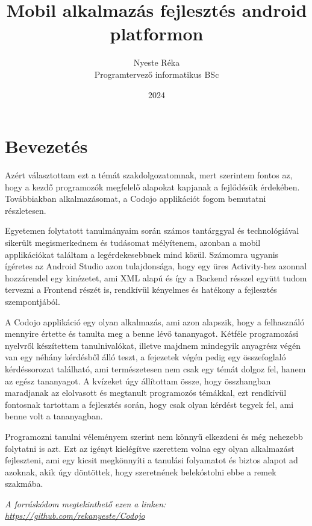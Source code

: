 \documentclass{thesis-ekf}
\begin{document}
	\title{Mobil alkalmazás fejlesztés android platformon}
	\author{Nyeste Réka\\Programtervező informatikus BSc}
	\date{2024}
	\maketitle
	\tableofcontents
	\chapter*{Bevezetés}
	Azért választottam ezt a témát szakdolgozatomnak, mert szerintem fontos az, hogy a kezdő programozók megfelelő alapokat kapjanak a fejlődésük érdekében. Továbbiakban alkalmazásomat, a Codojo applikációt fogom bemutatni részletesen.
	
	Egyetemen folytatott tanulmányaim során számos tantárggyal és technológiával sikerült megismerkednem és tudásomat mélyítenem, azonban a mobil applikációkat találtam a legérdekesebbnek mind közül. Számomra ugyanis ígéretes az Android Studio azon tulajdonsága, hogy egy üres Activity-hez azonnal hozzárendel egy kinézetet, ami XML alapú és így a Backend résszel együtt tudom tervezni a Frontend részét is, rendkívül kényelmes és hatékony a fejlesztés szempontjából.
	
	A Codojo applikáció egy olyan alkalmazás, ami azon alapszik, hogy a felhasználó mennyire értette és tanulta meg a benne lévő tananyagot. Kétféle programozási nyelvről készítettem tanulnivalókat, illetve majdnem mindegyik anyagrész végén van egy néhány kérdésből álló teszt, a fejezetek végén pedig egy összefoglaló kérdéssorozat található, ami természetesen nem csak egy témát dolgoz fel, hanem az egész tananyagot. A kvízeket úgy állítottam össze, hogy összhangban maradjanak az elolvasott és megtanult programozós témákkal, ezt rendkívül fontosnak tartottam a fejlesztés során, hogy csak olyan kérdést tegyek fel, ami benne volt a tananyagban.
	
	Programozni tanulni véleményem szerint nem könnyű elkezdeni és még nehezebb folytatni is azt. Ezt az igényt kielégítve szerettem volna egy olyan alkalmazást fejleszteni, ami egy kicsit megkönnyíti a tanulási folyamatot és biztos alapot ad azoknak, akik úgy döntöttek, hogy szeretnének belekóstolni ebbe a remek szakmába. 
	
	\textit{A forráskódom megtekinthető ezen a linken: \url{https://github.com/rekanyeste/Codojo}}
	
\end{document}
